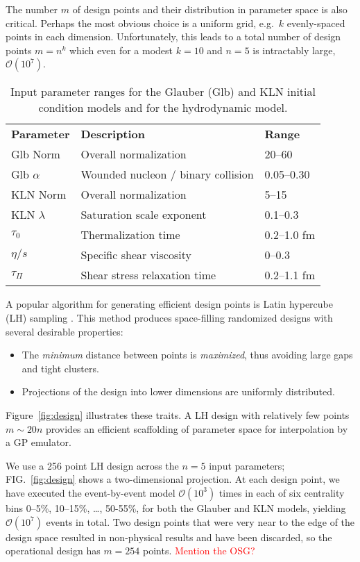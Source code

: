 \documentclass[aps,prc,reprint,amsmath]{revtex4-1}
\newcommand{\todo}[1]{\textcolor{red}{#1}}
\begin{document}
The number $m$ of design points and their distribution in parameter space is also critical.
Perhaps the most obvious choice is a uniform grid, e.g.\ $k$ evenly-spaced points in each dimension.
Unfortunately, this leads to a total number of design points $m = n^k$ which even for a modest $k = 10$ and $n = 5$ is intractably large, $\mathcal O(10^7)$.

\begin{table}[b]
  \caption{
    \label{tab:design}
    Input parameter ranges for the Glauber (Glb) and KLN initial condition models and for the hydrodynamic model.
  }
  \begin{ruledtabular}
  \begin{tabular}{lll}
    \bf Parameter & \bf Description & \bf Range \\
    Glb Norm & Overall normalization & 20--60 \\
    Glb $\alpha$ & Wounded nucleon / binary collision & 0.05--0.30 \\
    KLN Norm & Overall normalization & 5--15 \\
    KLN $\lambda$ & Saturation scale exponent & 0.1--0.3 \\
    $\tau_0$ & Thermalization time & 0.2--1.0 fm \\
    $\eta/s$ & Specific shear viscosity & 0--0.3 \\
    $\tau_\Pi$ & Shear stress relaxation time & 0.2--1.1 fm \\
  \end{tabular}
  \end{ruledtabular}
\end{table}

A popular algorithm for generating efficient design points is Latin hypercube (LH) sampling \cite{Tang:1993lh}.
This method produces space-filling randomized designs with several desirable properties:
\begin{itemize}
  \item The \emph{minimum} distance between points is \emph{maximized}, thus avoiding large gaps and tight clusters.
  \item Projections of the design into lower dimensions are uniformly distributed.
\end{itemize}
Figure~\ref{fig:design} illustrates these traits.
A LH design with relatively few points $m \sim 20n$ provides an efficient scaffolding of parameter space for interpolation by a GP emulator.

We use a 256 point LH design across the $n = 5$ input parameters; FIG.~\ref{fig:design} shows a two-dimensional projection.
At each design point, we have executed the event-by-event model $\mathcal O(10^3)$ times in each of six centrality bins 0--5\%, 10--15\%, \ldots, 50-55\%, for both the Glauber and KLN models, yielding $\mathcal O(10^7)$ events in total.
Two design points that were very near to the edge of the design space resulted in non-physical results and have been discarded, so the operational design has $m = 254$ points.
\todo{Mention the OSG?}
\end{document}
